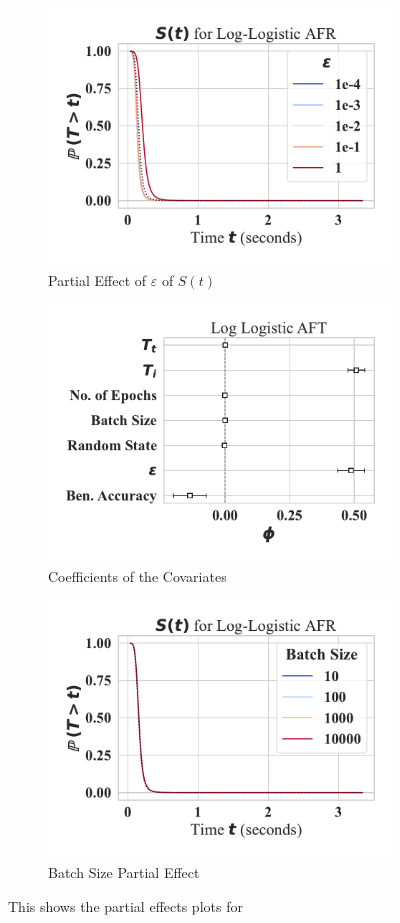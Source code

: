 \documentclass[conference]{IEEEtran}
\begin{document}
\begin{figure}[h!]
    \centering
    \begin{subfigure}[b]{\linewidth}
        \includegraphics[width=.8\linewidth,clip]{plots/combined/log_logistic_attack_eps_partial_effect.pdf}
        \caption{Partial Effect  of $\varepsilon$ of $S(t)$ }
    \end{subfigure}
    \begin{subfigure}[b]{\linewidth}
        \includegraphics[width=.8\linewidth,clip]{plots/combined/log_logistic_aft.pdf}
        \caption{Coefficients of the Covariates}
    \end{subfigure}
    \begin{subfigure}[b]{\linewidth}
        \includegraphics[width=.8\linewidth,clip]{plots/combined/log_logistic_batch_size_partial_effect.pdf}
        \caption{Batch Size Partial Effect}
    \end{subfigure}
    \caption{This shows the partial effects plots for}
\end{figure}
\end{document}
